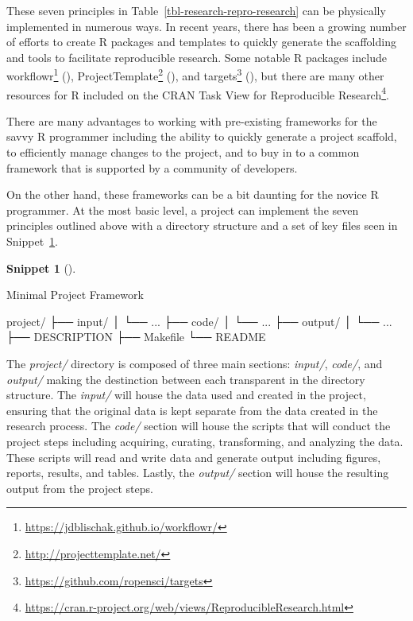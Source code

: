 \documentclass[
  letterpaper,
  krantz1]{latex/krantz-mod}
\newenvironment{Shaded}{\begin{snugshade}}{\end{snugshade}}
\newcommand{\ExtensionTok}[1]{\textcolor[rgb]{0.00,0.00,0.00}{#1}}
\newcommand{\NormalTok}[1]{\textcolor[rgb]{0.00,0.00,0.00}{#1}}
\theoremstyle{definition}
\theoremstyle{definition}
\newtheorem{definition}{Snippet}[chapter]
\theoremstyle{remark}
\DeclareRobustCommand{\href}[2]{#2\footnote{\url{#1}}}
\begin{document}
These seven principles in Table~\ref{tbl-research-repro-research} can be
physically implemented in numerous ways. In recent years, there has been
a growing number of efforts to create R packages and templates to
quickly generate the scaffolding and tools to facilitate reproducible
research. Some notable R packages include
\href{https://jdblischak.github.io/workflowr/}{workflowr}
(),
\href{http://projecttemplate.net/}{ProjectTemplate}
(), and
\href{https://github.com/ropensci/targets}{targets}
(), but there are many other
resources for R included on the
\href{https://cran.r-project.org/web/views/ReproducibleResearch.html}{CRAN
Task View for Reproducible Research}.

There are many advantages to working with pre-existing frameworks for
the savvy R programmer including the ability to quickly generate a
project scaffold, to efficiently manage changes to the project, and to
buy in to a common framework that is supported by a community of
developers.

On the other hand, these frameworks can be a bit daunting for the novice
R programmer. At the most basic level, a project can implement the seven
principles outlined above with a directory structure and a set of key
files seen in Snippet~\ref{def-research-basic-project}.

\begin{definition}[]\protect\hypertarget{def-research-basic-project}{}\label{def-research-basic-project}

Minimal Project Framework

\begin{Shaded}
\begin{Highlighting}[]
\ExtensionTok{project/}
\ExtensionTok{├──}\NormalTok{ input/}
\ExtensionTok{│}\NormalTok{   └── ...}
\ExtensionTok{├──}\NormalTok{ code/}
\ExtensionTok{│}\NormalTok{   └── ...}
\ExtensionTok{├──}\NormalTok{ output/}
\ExtensionTok{│}\NormalTok{   └── ...}
\ExtensionTok{├──}\NormalTok{ DESCRIPTION}
\ExtensionTok{├──}\NormalTok{ Makefile}
\ExtensionTok{└──}\NormalTok{ README}
\end{Highlighting}
\end{Shaded}

\end{definition}

The \emph{project/} directory is composed of three main sections:
\emph{input/}, \emph{code/}, and \emph{output/} making the destinction
between each transparent in the directory structure. The \emph{input/}
will house the data used and created in the project, ensuring that the
original data is kept separate from the data created in the research
process. The \emph{code/} section will house the scripts that will
conduct the project steps including acquiring, curating, transforming,
and analyzing the data. These scripts will read and write data and
generate output including figures, reports, results, and tables. Lastly,
the \emph{output/} section will house the resulting output from the
project steps.
\end{document}
